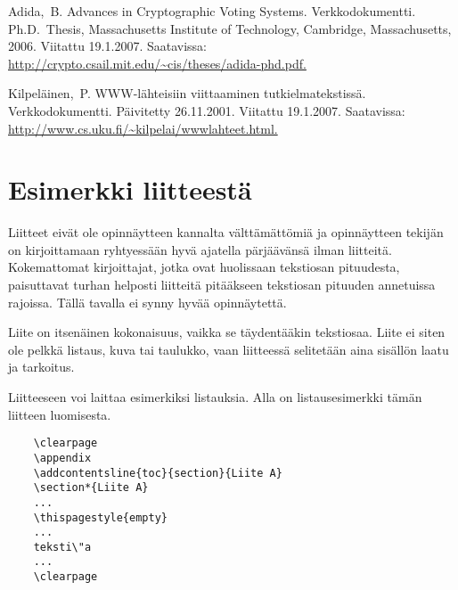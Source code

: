 \documentclass[english,12pt,a4paper,pdftex,sci,utf8]{aaltothesis}
\begin{document}
\begin{thebibliography}{99}
 Adida,\ B.  Advances in Cryptographic Voting Systems.
  Verkkodokumentti. Ph.D.\ Thesis, Massachusetts Institute of
  Technology, Cambridge,
  Massachusetts,
  2006. Viitattu 19.1.2007.  Saatavissa:
  \url{http://crypto.csail.mit.edu/~cis/theses/adida-phd.pdf.}

 Kilpel\"ainen,\ P. WWW-l\"ahteisiin viittaaminen
  tutkielmatekstiss\"a. Verkkodokumentti. P\"aivitetty 26.11.2001.
  Viitattu 19.1.2007. Saatavissa:
  \url{http://www.cs.uku.fi/~kilpelai/wwwlahteet.html.}

\end{thebibliography}

\clearpage

\thesisappendix

\section{Esimerkki liitteest\"a\label{LiiteA}}

Liitteet eiv\"at ole opinn\"aytteen kannalta v\"altt\"am\"att\"omi\"a ja
opinn\"aytteen tekij\"an on
kirjoittamaan ryhtyess\"a\"an hyv\"a ajatella p\"arj\"a\"av\"ans\"a ilman liitteit\"a.
Kokemattomat kirjoittajat, jotka ovat huolissaan
tekstiosan pituudesta, paisuttavat turhan
helposti liitteit\"a pit\"a\"akseen tekstiosan pituuden annetuissa rajoissa.
T\"all\"a tavalla ei synny hyv\"a\"a opinn\"aytett\"a.

Liite on itsen\"ainen kokonaisuus, vaikka se t\"aydent\"a\"akin tekstiosaa.
Liite ei siten ole pelkk\"a listaus, kuva tai taulukko, vaan
liitteess\"a selitet\"a\"an aina sis\"all\"on laatu ja tarkoitus.

Liitteeseen voi laittaa esimerkiksi listauksia. Alla on
listausesimerkki t\"am\"an liitteen luomisesta.

\begin{verbatim}
	\clearpage
	\appendix
	\addcontentsline{toc}{section}{Liite A}
	\section*{Liite A}
	...
	\thispagestyle{empty}
	...
	teksti\"a
	...
	\clearpage
\end{verbatim}
\end{document}
